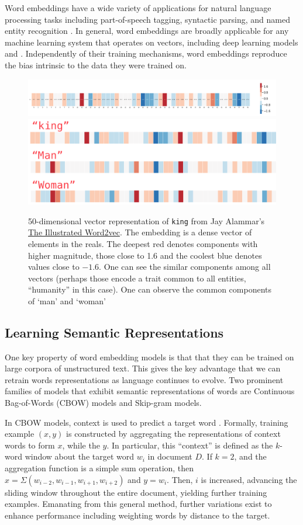 \documentclass[11pt,a4paper]{article}
\begin{document}
Word embeddings have a wide variety of applications for natural language
processing tasks including part-of-speech tagging, syntactic parsing, and named
entity recognition \cite{lison2017redefining}. In general, word embeddings are
broadly applicable for any machine learning system that operates on vectors,
including deep learning models and . Independently of their training mechanisms,
word embeddings reproduce the bias intrinsic to the data they were trained on.

\begin{figure}
  \includegraphics[width=.5\textwidth]{figures/king-colored-embedding.png}
  \includegraphics[width=.45\textwidth]{figures/king-man-woman-embedding.png}
  \caption{50-dimensional vector representation of \texttt{king} from Jay
    Alammar's \href{https://jalammar.github.io/illustrated-word2vec/}{The
    Illustrated Word2vec}. The embedding is a dense vector of elements in the
    reals. The deepest red denotes components with higher magnitude, those close
    to 1.6 and the coolest blue denotes values close to $-1.6$. One can see the
    similar components among all vectors (perhaps those encode a trait common to
    all entities, ``humanity'' in this case). One can observe the common
    components of `man' and `woman'}
\end{figure}

\subsection{Learning Semantic Representations}

One key property of word embedding models is that that they can be trained on
large corpora of unstructured text. This gives the key advantage that we can
retrain words representations as language continues to evolve. Two prominent
families of models  that exhibit semantic representations of words are
Continuous Bag-of-Words (CBOW) models and Skip-gram models.

In CBOW models, context is used to predict a target word
\citep{mikolov2013exploiting}. Formally, training example $(x,y)$ is constructed
by aggregating the representations of context words to form $x$, while the $y$.
In particular, this ``context'' is defined as the $k$-word window about the
target word $w_i$ in document $D$. If $k=2$, and the aggregation function is a
simple sum operation, then $x = \Sigma (w_{i-2}, w_{i-1}, w_{i+1}, w_{i+2})$ and
$y=w_i$. Then, $i$ is increased, advancing the sliding window throughout the
entire document, yielding further training examples. Emanating from this general
method, further variations exist to enhance performance including weighting words by distance to the target.
\end{document}
